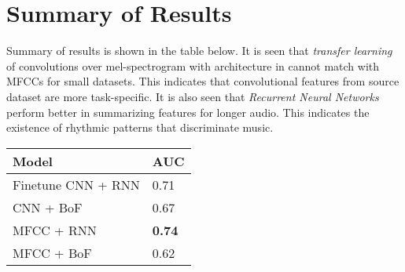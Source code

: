 \section{Summary of Results}
\label{results}
Summary of results is shown in the table below. It is seen that \textit{transfer learning} of convolutions over mel-spectrogram with architecture in \cite{choi_cnn}  cannot match with MFCCs for small datasets. This indicates that convolutional features from source dataset are more task-specific. It is also seen that \textit{Recurrent Neural Networks} perform better in summarizing features for longer audio. This indicates the existence of rhythmic patterns that discriminate music. 

   \begin{tabular}{ | p{5cm} | l |}
    \hline
    \textbf{Model} & \textbf{AUC} \\ \hline
    Finetune CNN + RNN &  0.71\\ \hline
    CNN + BoF  &  0.67\\ \hline
    MFCC + RNN &  \textbf{0.74} \\ \hline
    MFCC + BoF &  0.62 \\ \hline
    \hline
    \end{tabular}

